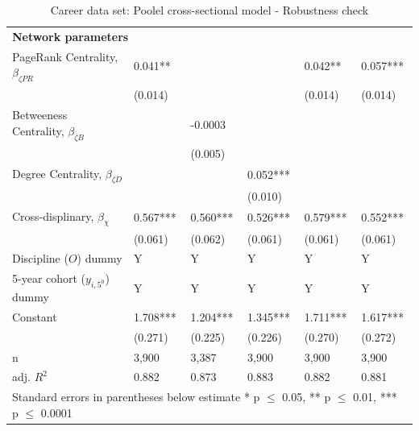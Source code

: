 \documentclass[10pt]{article}          %
\begin{document}
\begin{table}[h]
\begin{tabular}{m{5cm} p{2.1cm} p{2.1cm} p{2.1cm} p{2.1cm} p{2.1cm} }
\multicolumn{6}{l}{\textbf{Network parameters}} \\
{PageRank Centrality, $\beta_{\zeta PR}$}     & 0.041** &  &              & 0.042**   & 0.057***  \\ 
                                              & (0.014) &  &              & (0.014)   & (0.014)   \\
{Betweeness Centrality, $\beta_{\zeta B}$}    &  & -0.0003 &  &  &  \\ 
                                              &  & (0.005) & & & \\
{Degree Centrality, $\beta_{\zeta D}$}        &  &  & 0.052*** & & \\ 
                                              &  &  & (0.010) & & \\
\rowcolor{lightgray}
{Cross-displinary, $\beta_{\chi}$}          & 0.567***  & 0.560***  & 0.526***  & 0.579***  & 0.552***  \\
                                            & (0.061)   & (0.062)   & (0.061)   & (0.061)   & (0.061) \\ \hline

\rowcolor{lightgray}
{Discipline ($O$) dummy}                & Y & Y & Y & Y & Y  \\
\rowcolor{lightgray}
{5-year cohort ($y_{i,5^0}$) dummy}   & Y & Y & Y & Y & Y \\
\rowcolor{lightgray}
{Constant}                            & 1.708***  & 1.204***  & 1.345***  & 1.711***  & 1.617***  \\ 
                                      & (0.271)   & (0.225)   & (0.226)   & (0.270)   & (0.272)   \\ \hline

\rowcolor{lightgray}
{n}                                   & 3,900 & 3,387 & 3,900 & 3,900 & 3,900 \\
\rowcolor{lightgray}
{adj. $R^2$}                          & 0.882 & 0.873 & 0.883 & 0.882 & 0.881 \\ \hline \hline
\multicolumn{6}{l}{\footnotesize{Standard errors in parentheses below estimate * p $\leq$ 0.05, ** p $\leq$ 0.01, *** p $\leq$ 0.0001}}

\end{tabular}
\caption{Career data set: Poolel cross-sectional model - Robustness check}
\label{tbl:sT3}
\end{table}

\bigskip   %
\end{document}
